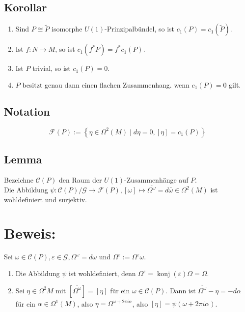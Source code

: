 \documentclass[10pt, letterpaper]{article}
\begin{document}
\subsection*{Korollar}
\begin{enumerate}
  \item Sind $P \cong \tilde{P}$ isomorphe $U(1)$-Prinzipalbündel, so ist $c_{1}(P)=c_{1}(\tilde{P})$.
  \item Ist $f: N \rightarrow M$, so ist $c_{1}\left(f^{*} P\right)=f^{*} c_{1}(P)$.
  \item Ist $P$ trivial, so ist $c_{1}(P)=0$.
  \item $P$ besitzt genau dann einen flachen Zusammenhang. wenn $c_{1}(P)=0$ gilt.
\end{enumerate}

\subsection*{Notation}
$$
\mathcal{F}(P):=\left\{\eta \in \Omega^{2}(M) \mid d \eta=0,[\eta]=c_{1}(P)\right\}
$$

\subsection*{Lemma}
Bezeichne $\mathcal{C}(P)$ den Raum der $U(1)$-Zusammenhänge auf $P$.\\
Die Abbildung $\psi: \mathcal{C}(P) / \mathcal{G} \rightarrow \mathcal{F}(P),[\omega] \mapsto \overline{\Omega^{\omega}}=d \bar{\omega} \in \Omega^{2}(M)$ ist wohldefiniert und surjektiv.

\section*{Beweis:}
Sei $\omega \in \mathcal{C}(P), \varepsilon \in \mathcal{G}, \Omega^{\omega}=d \omega$ und $\Omega^{\varepsilon}:=\Omega^{\varepsilon} \omega$.

\begin{enumerate}
  \item Die Abbildung $\psi$ ist wohldefiniert, denn $\Omega^{\varepsilon}=\operatorname{konj}(\varepsilon) \Omega=\Omega$.
  \item Sei $\eta \in \Omega^{2} M$ mit $\left[\overline{\Omega^{\omega}}\right]=[\eta]$ für ein $\omega \in \mathcal{C}(P)$. Dann ist $\overline{\Omega^{\omega}}-\eta=-d \alpha$ für ein $\alpha \in \Omega^{1}(M)$, also $\eta=\overline{\Omega^{\omega+2 \pi i \alpha}}$, also $[\eta]=\psi(\omega+2 \pi i \alpha)$.
\end{enumerate}
\end{document}
